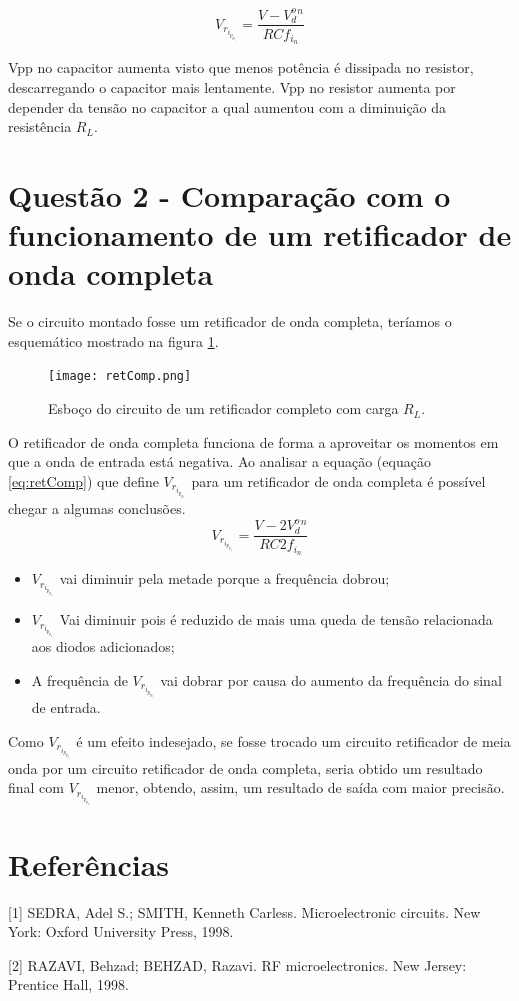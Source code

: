 \documentclass{abntex2}
\begin{document}
\begin{equation}
  V_r_i_p_p_l_e = \frac{V-V_d^o^n}{RCf_i_n}
  \label{eq:ripp}
\end{equation}

Vpp no capacitor aumenta visto que menos potência é dissipada no resistor, descarregando o capacitor mais lentamente.
Vpp no resistor aumenta por depender da tensão no capacitor a qual aumentou com a diminuição da resistência $R_L$.



\section{Questão 2 - Comparação com o funcionamento de um retificador de onda completa}


Se o circuito montado fosse um retificador de onda completa, teríamos o esquemático mostrado na figura \ref{fig:retComp}.

\begin{figure}[h]
  \centering
  \texttt{[image: retComp.png]}
  \caption{Esboço do circuito de um retificador completo com carga $R_L$.}
  \label{fig:retComp}
\end{figure}

O retificador de onda completa funciona de forma a aproveitar os momentos em que a onda de entrada está negativa. Ao analisar a equação (equação  \ref{eq:retComp}) que define $V_r_i_p_p_l_e$ para um retificador de onda completa é possível
chegar a algumas conclusões.
\begin{equation}
  V_r_i_p_p_l_e = \frac{V-2V_d^o^n}{RC2f_i_n}
  \label{eq:retComp}
\end{equation}

\begin{itemize}
  \item $V_r_i_p_p_l_e$ vai diminuir pela metade porque a frequência dobrou;
  \item $V_r_i_p_p_l_e$ Vai diminuir pois é reduzido de mais uma queda de tensão relacionada aos diodos adicionados;
  \item A frequência de $V_r_i_p_p_l_e$ vai dobrar por causa do aumento da frequência do sinal de entrada.
\end{itemize}

Como $V_r_i_p_p_l_e$ é um efeito indesejado, se fosse trocado um circuito retificador de meia onda por um circuito retificador de onda completa,
seria obtido um resultado final com $V_r_i_p_p_l_e$ menor, obtendo, assim, um resultado de saída com maior precisão.

\section*{Referências}


[1] SEDRA, Adel S.; SMITH, Kenneth Carless. Microelectronic circuits. New York: Oxford University Press, 1998.

[2] RAZAVI, Behzad; BEHZAD, Razavi. RF microelectronics. New Jersey: Prentice Hall, 1998.
\end{document}
